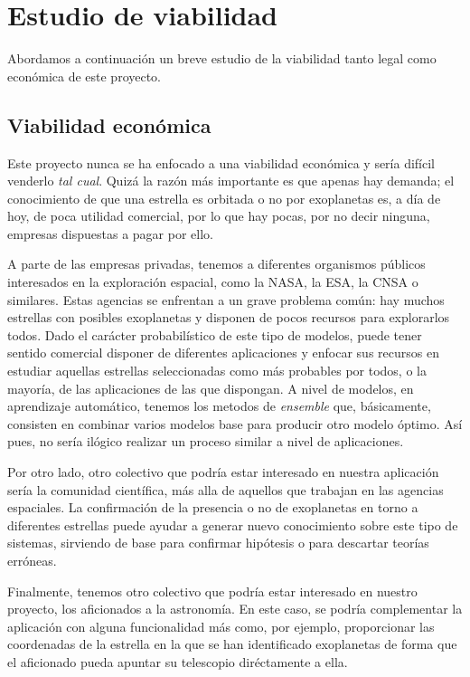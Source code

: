 \section{Estudio de viabilidad}

Abordamos a continuación un breve estudio de la viabilidad tanto legal como económica de este proyecto.

\subsection{Viabilidad económica}

Este proyecto nunca se ha enfocado a una viabilidad económica y sería difícil venderlo \textit{tal cual}. Quizá la razón más importante es que apenas hay demanda; el conocimiento de que una estrella es orbitada o no por exoplanetas es, a día de hoy, de poca utilidad comercial, por lo que hay pocas, por no decir ninguna, empresas dispuestas a pagar por ello.

A parte de las empresas privadas, tenemos a diferentes organismos públicos interesados en la exploración espacial, como la NASA, la ESA, la CNSA o similares. Estas agencias se enfrentan a un grave problema común: hay muchos estrellas con posibles exoplanetas y disponen de pocos recursos para explorarlos todos. Dado el carácter probabilístico de este tipo de modelos, puede tener sentido comercial disponer de diferentes aplicaciones y enfocar sus recursos en estudiar aquellas estrellas seleccionadas como más probables por todos, o la mayoría, de las aplicaciones de las que dispongan. A nivel de modelos, en aprendizaje automático, tenemos los metodos de \textit{ensemble} que, básicamente, consisten en combinar varios modelos base para producir otro modelo óptimo. Así pues, no sería ilógico realizar un proceso similar a nivel de aplicaciones.

Por otro lado, otro colectivo que podría estar interesado en nuestra aplicación sería la comunidad científica, más alla de aquellos que trabajan en las agencias espaciales. La confirmación de la presencia o no de exoplanetas en torno a diferentes estrellas puede ayudar a generar nuevo conocimiento sobre este tipo de sistemas, sirviendo de base para confirmar hipótesis o para descartar teorías erróneas. 

Finalmente, tenemos otro colectivo que podría estar interesado en nuestro proyecto, los aficionados a la astronomía. En este caso, se podría complementar la aplicación con alguna funcionalidad más como, por ejemplo, proporcionar las coordenadas de la estrella en la que se han identificado exoplanetas de forma que el aficionado pueda apuntar su telescopio diréctamente a ella.


